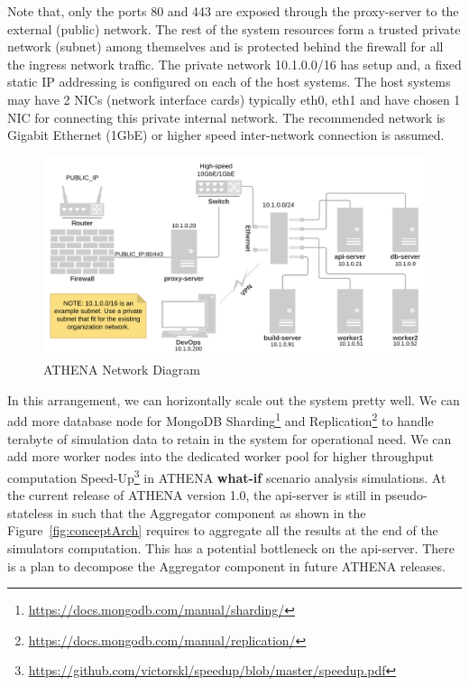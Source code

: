 Note that, only the ports 80 and 443 are exposed through the proxy-server to the external (public) network. The rest of the system resources form a trusted private network (subnet) among themselves and is protected behind the firewall for all the ingress network traffic. The private network 10.1.0.0/16 has setup and, a fixed static IP addressing is configured on each of the host systems. The host systems may have 2 NICs (network interface cards) typically eth0, eth1 and have chosen 1 NIC for connecting this private internal network. The recommended network is Gigabit Ethernet (1GbE) or higher speed inter-network connection is assumed.

\begin{figure}[H]
\centering
\includegraphics[width=0.7\paperwidth]{Figures/ATHENA_network_diagram}
\decoRule
\caption[ATHENA Network Diagram]{ATHENA Network Diagram}
\label{fig:deployNetwork}
\end{figure}

In this arrangement, we can horizontally scale out the system pretty well. We can add more database node for MongoDB Sharding\footnote{\url{https://docs.mongodb.com/manual/sharding/}} and Replication\footnote{\url{https://docs.mongodb.com/manual/replication/}} to handle terabyte of simulation data to retain in the system for operational need. We can add more worker nodes into the dedicated worker pool for higher throughput computation Speed-Up\footnote{\url{https://github.com/victorskl/speedup/blob/master/speedup.pdf}} in ATHENA \textbf{what-if} scenario analysis simulations. At the current release of ATHENA version 1.0, the api-server is still in pseudo-stateless in such that the Aggregator component as shown in the Figure~\ref{fig:conceptArch} requires to aggregate all the results at the end of the simulators computation. This has a potential bottleneck on the api-server. There is a plan to decompose the Aggregator component in future ATHENA releases.

